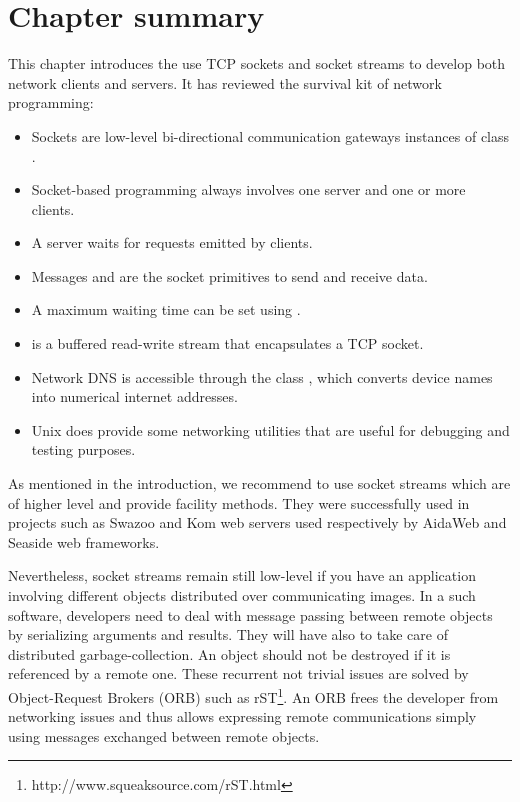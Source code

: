 \documentclass[a4paper,10pt,twoside]{book}
\begin{document}
\section{Chapter summary}
This chapter introduces the use TCP sockets and socket streams to develop both network clients and servers. It has reviewed the survival kit of network programming:

\begin{itemize}
\item Sockets are low-level bi-directional communication gateways instances of class .
\item Socket-based programming always involves one server and one or more clients.
\item A server waits for requests emitted by clients.
\item Messages  and  are the socket primitives to send and receive data.
\item A maximum waiting time can be set using .
\item {} is a buffered read-write stream that encapsulates a TCP socket.
\item Network DNS is accessible through the class , which converts device names into numerical internet addresses.
\item Unix does provide some networking utilities that are useful for debugging and testing purposes.
\end{itemize}

As mentioned in the introduction, we recommend to use socket streams which are of higher level and provide facility methods.
They were successfully used in projects such as Swazoo and Kom web servers used respectively by AidaWeb and Seaside web frameworks.

Nevertheless, socket streams remain still low-level if you have an application involving different objects distributed over communicating images.
In a such software, developers need to deal with message passing between remote objects by serializing arguments and results.
They will have also to take care of distributed garbage-collection.
An object should not be destroyed if it is referenced by a remote one.
These recurrent not trivial issues are solved by Object-Request Brokers (ORB) such as rST\footnote{http://www.squeaksource.com/rST.html}.
An ORB frees the developer from networking issues and thus allows expressing remote communications simply using messages exchanged between remote objects.


\ifx\wholebook\relax\else
\end{document}
